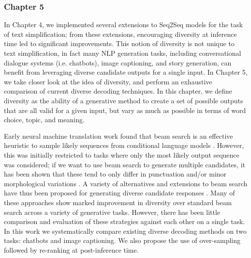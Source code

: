 \documentclass[thesis.tex]{subfiles}
\begin{document}
\subsubsection{Chapter 5}

In Chapter 4, we implemented several extensions to Seq2Seq models for the task of text simplification; from these extensions, encouraging diversity at inference time led to significant improvements. This notion of diversity is not unique to text simplification, in fact many NLP generation tasks, including conversational dialogue systems (i.e. chatbots), image captioning, and story generation, can benefit from leveraging diverse candidate outputs for a single input. In Chapter 5, we take closer look at the idea of diversity, and perform an exhaustive comparison of current diverse decoding techniques. In this chapter, we define diversity as the ability of a generative method to create a set of possible outputs that are all valid for a given input, but vary as much as possible in terms of word choice, topic, and meaning.

Early neural machine translation work found that beam search is an effective heuristic to sample likely sequences from conditional language models \citep{sutskever2014sequence}. However, this was initially restricted to tasks where only the most likely output sequence was considered; if we want to use beam search to generate multiple candidates, it has been shown that these tend to only differ in punctuation and/or minor morphological variations \citep{li2016mutual}. A variety of alternatives and extensions to beam search have thus been proposed for generating diverse candidate responses \citep{li2016diversity,vijayakumar2016diverse,kulikov2018importance,tam2019clustered}. Many of these approaches show marked improvement in diversity over standard beam search across a variety of generative tasks. However, there has been little comparison and evaluation of these strategies against each other on a single task. In this work we systematically compare existing diverse decoding methods on two tasks: chatbots and image captioning. We also propose the use of over-sampling followed by re-ranking at post-inference time. 
\end{document}
